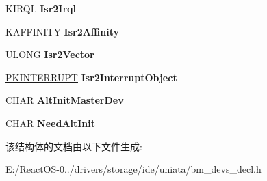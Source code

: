 \begin{DoxyCompactItemize}
\begin{tabbing}
\end{tabbing}\item 
\mbox{\label{struct___b_u_s_m_a_s_t_e_r___c_o_n_t_r_o_l_l_e_r___i_n_f_o_r_m_a_t_i_o_n_ab62f3e9154075e69098febad6872f899}} 
K\+I\+R\+QL {\bfseries Isr2\+Irql}
\item 
\mbox{\label{struct___b_u_s_m_a_s_t_e_r___c_o_n_t_r_o_l_l_e_r___i_n_f_o_r_m_a_t_i_o_n_a18bf8a74260fceb2609ffa534766a254}} 
K\+A\+F\+F\+I\+N\+I\+TY {\bfseries Isr2\+Affinity}
\item 
\mbox{\label{struct___b_u_s_m_a_s_t_e_r___c_o_n_t_r_o_l_l_e_r___i_n_f_o_r_m_a_t_i_o_n_a696b2f46625f06934e1026a3f85bfd27}} 
U\+L\+O\+NG {\bfseries Isr2\+Vector}
\item 
\mbox{\label{struct___b_u_s_m_a_s_t_e_r___c_o_n_t_r_o_l_l_e_r___i_n_f_o_r_m_a_t_i_o_n_a1f2e8e00e72b8f6fa0457a385b7b9eea}} 
\hyperlink{struct___k_i_n_t_e_r_r_u_p_t}{P\+K\+I\+N\+T\+E\+R\+R\+U\+PT} {\bfseries Isr2\+Interrupt\+Object}
\item 
\mbox{\label{struct___b_u_s_m_a_s_t_e_r___c_o_n_t_r_o_l_l_e_r___i_n_f_o_r_m_a_t_i_o_n_a0beabb04817b236a0f4b0cc57059b03e}} 
C\+H\+AR {\bfseries Alt\+Init\+Master\+Dev}
\item 
\mbox{\label{struct___b_u_s_m_a_s_t_e_r___c_o_n_t_r_o_l_l_e_r___i_n_f_o_r_m_a_t_i_o_n_aca2262902a46344736326ee362916bb1}} 
C\+H\+AR {\bfseries Need\+Alt\+Init}
\end{DoxyCompactItemize}


该结构体的文档由以下文件生成\+:\begin{DoxyCompactItemize}
\item 
E\+:/\+React\+O\+S-\/0../drivers/storage/ide/uniata/bm\+\_\+devs\+\_\+decl.\+h\end{DoxyCompactItemize}
